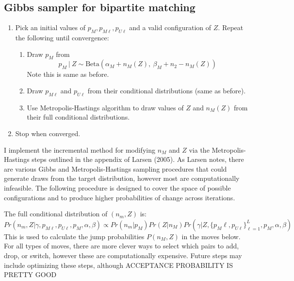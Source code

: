 \documentclass[11pt,reqno]{amsart}
\begin{document}
\subsection{Gibbs sampler for bipartite matching \citep{larsen_2005}}
\label{app:gibbsB}
\begin{enumerate} 
\item Pick an initial values of $p_M, p_{M\ell}, p_{U\ell}$ and a valid configuration of $Z$.  Repeat the following until convergence:
\begin{enumerate} 
\item Draw $p_M$ from $$ p_M\ |\ Z \sim \text{Beta}(\alpha_M + n_{M}(Z),\ \beta_M + n_{2} - n_{M}(Z)) $$ Note this is same as before. 

\item  Draw $p_{M\ell}$ and $p_{U\ell}$ from their conditional distributions (same as before).

\item Use Metropolis-Hastings algorithm to draw values of $Z$ and $n_{M}(Z)$ from their full conditional distributions. 

\end{enumerate}

\item Stop when converged. 
\end{enumerate}



I implement the incremental method for modifying $n_M$ and $Z$ via the Metropolis-Hastings steps outlined in the appendix of Larsen (2005).  As Larsen notes, there are various Gibbs and Metropolis-Hastings sampling procedures that could generate draws from the target distribution, however most are computationally infeasible.  The following procedure is designed to cover the space of possible configurations and to produce higher probabilities of change across iterations.  

The full conditional distribution of $(n_m, Z)$ is:
\begin{equation} 
Pr\left(n_m, Z | \gamma, p_{M\ell}, p_{U\ell}, p_M, \alpha, \beta \right) \propto Pr(n_m | p_M) Pr(Z | n_M) Pr\left(\gamma | Z,  \{p_M{\ell}, p_{U\ell}\}_{\ell=1}^L, p_M, \alpha, \beta \right) \label{nmZ} \end{equation}
This is used to calculate the jump probabilities $P(n_M, Z) $ in the moves below.  For all types of moves, there are more clever ways to select which pairs to add, drop, or switch, however these are computationally expensive.  Future steps may include optimizing these steps, although ACCEPTANCE PROBABILITY IS PRETTY GOOD %
\end{document}
